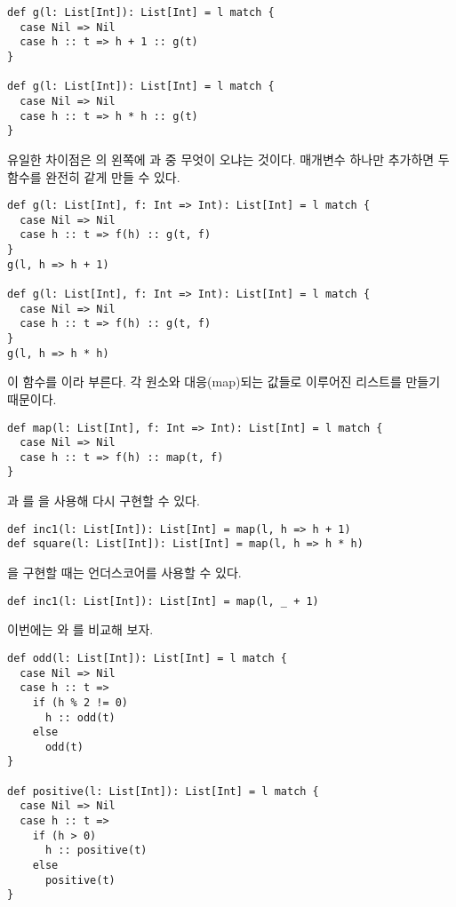 \begin{verbatim}
def g(l: List[Int]): List[Int] = l match {
  case Nil => Nil
  case h :: t => h + 1 :: g(t)
}

def g(l: List[Int]): List[Int] = l match {
  case Nil => Nil
  case h :: t => h * h :: g(t)
}
\end{verbatim}

유일한 차이점은 \code{::}의 왼쪽에 과  중 무엇이 오냐는
것이다. 매개변수 하나만 추가하면 두 함수를 완전히 같게 만들 수 있다.

\begin{verbatim}
def g(l: List[Int], f: Int => Int): List[Int] = l match {
  case Nil => Nil
  case h :: t => f(h) :: g(t, f)
}
g(l, h => h + 1)

def g(l: List[Int], f: Int => Int): List[Int] = l match {
  case Nil => Nil
  case h :: t => f(h) :: g(t, f)
}
g(l, h => h * h)
\end{verbatim}

이 함수를 이라 부른다. 각 원소와 대응(map)되는 값들로 이루어진
리스트를 만들기 때문이다.

\begin{verbatim}
def map(l: List[Int], f: Int => Int): List[Int] = l match {
  case Nil => Nil
  case h :: t => f(h) :: map(t, f)
}
\end{verbatim}

과 를 을 사용해 다시 구현할 수 있다.

\begin{verbatim}
def inc1(l: List[Int]): List[Int] = map(l, h => h + 1)
def square(l: List[Int]): List[Int] = map(l, h => h * h)
\end{verbatim}

을 구현할 때는 언더스코어를 사용할 수 있다.

\begin{verbatim}
def inc1(l: List[Int]): List[Int] = map(l, _ + 1)
\end{verbatim}

이번에는 와 를 비교해 보자.

\begin{verbatim}
def odd(l: List[Int]): List[Int] = l match {
  case Nil => Nil
  case h :: t =>
    if (h % 2 != 0)
      h :: odd(t)
    else
      odd(t)
}

def positive(l: List[Int]): List[Int] = l match {
  case Nil => Nil
  case h :: t =>
    if (h > 0)
      h :: positive(t)
    else
      positive(t)
}
\end{verbatim}

